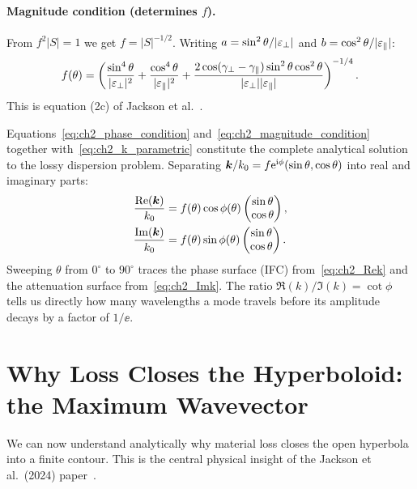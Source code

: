 \paragraph{Magnitude condition (determines $f$).}
From $f^2|S| = 1$ we get $f = |S|^{-1/2}$. Writing $a = \sin^2\theta/|\varepsilon_{\perp}|$
and $b = \cos^2\theta/|\varepsilon_{\parallel}|$:
\begin{equation}
  f(\theta) = \left(\frac{\sin^4\theta}{|\varepsilon_{\perp}|^2}
            + \frac{\cos^4\theta}{|\varepsilon_{\parallel}|^2}
            + \frac{2\cos(\gamma_\perp - \gamma_\parallel)\sin^2\theta\cos^2\theta}
                   {|\varepsilon_{\perp}||\varepsilon_{\parallel}|}\right)^{-1/4}.
  \label{eq:ch2_magnitude_condition}
\end{equation}
This is equation (2c) of Jackson et al.~\cite{jackson2024}.

Equations~\eqref{eq:ch2_phase_condition} and~\eqref{eq:ch2_magnitude_condition}
together with~\eqref{eq:ch2_k_parametric} constitute the complete analytical
solution to the lossy dispersion problem. Separating
$\bm{k}/k_0 = f\mathrm{e}^{\mathrm{i}\phi}(\sin\theta, \cos\theta)$ into real and imaginary
parts:
\begin{align}
  \frac{\operatorname{Re}(\bm{k})}{k_0} &= f(\theta)\cos\phi(\theta)
    \begin{pmatrix}\sin\theta\\\cos\theta\end{pmatrix},
  \label{eq:ch2_Rek} \\
  \frac{\operatorname{Im}(\bm{k})}{k_0} &= f(\theta)\sin\phi(\theta)
    \begin{pmatrix}\sin\theta\\\cos\theta\end{pmatrix}.
  \label{eq:ch2_Imk}
\end{align}
Sweeping $\theta$ from $0^\circ$ to $90^\circ$ traces the phase surface
(IFC) from~\eqref{eq:ch2_Rek} and the attenuation surface
from~\eqref{eq:ch2_Imk}. The ratio $\Re(k)/\Im(k) = \cot\phi$ tells us
directly how many wavelengths a mode travels before its amplitude decays
by a factor of $1/\ee$.

\section{Why Loss Closes the Hyperboloid: the Maximum Wavevector}

We can now understand analytically why material loss closes the open
hyperbola into a finite contour. This is the central physical insight of
the Jackson et al.\ (2024) paper~\cite{jackson2024}.

